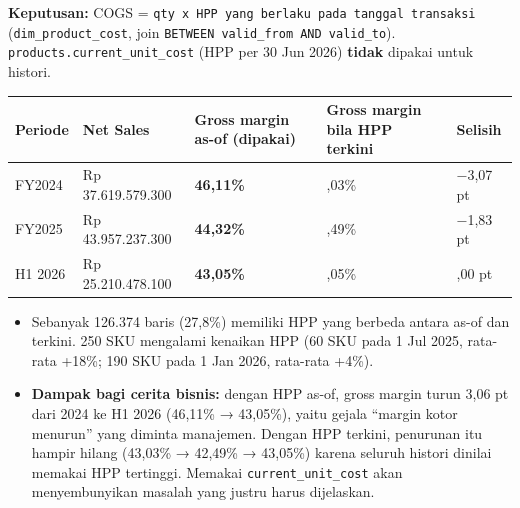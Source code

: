 \documentclass[10pt,a4paper]{article}
\providecommand{\tightlist}{\setlength{\itemsep}{1pt}\setlength{\parskip}{0pt}}
\begin{document}
\textbf{Keputusan:} COGS = \texttt{qty\ x\ HPP\ yang\ berlaku\ pada\ tanggal\ transaksi} (\texttt{dim\_\allowbreak{}product\_\allowbreak{}cost}, join \texttt{BETWEEN\ valid\_\allowbreak{}from\ AND\ valid\_\allowbreak{}to}).
\texttt{products.current\_\allowbreak{}unit\_\allowbreak{}cost} (HPP per 30 Jun 2026) \textbf{tidak} dipakai untuk histori.

{\def\LTcaptype{none} %
\begin{longtable}[]{@{}
  >{\raggedright\arraybackslash}p{}
  >{\raggedleft\arraybackslash}p{}
  >{\raggedleft\arraybackslash}p{}
  >{\raggedleft\arraybackslash}p{}
  >{\raggedleft\arraybackslash}p{}@{}}
\toprule\noalign{}
\begin{minipage}[b]{\linewidth}\raggedright
Periode
\end{minipage} & \begin{minipage}[b]{\linewidth}\raggedleft
Net Sales
\end{minipage} & \begin{minipage}[b]{\linewidth}\raggedleft
Gross margin as-of (dipakai)
\end{minipage} & \begin{minipage}[b]{\linewidth}\raggedleft
Gross margin bila HPP terkini
\end{minipage} & \begin{minipage}[b]{\linewidth}\raggedleft
Selisih
\end{minipage} \\
\midrule\noalign{}
\endhead
\bottomrule\noalign{}
\endlastfoot
FY2024 & Rp 37.619.579.300 & \textbf{46,11\%} & 43,03\% & −3,07 pt \\
FY2025 & Rp 43.957.237.300 & \textbf{44,32\%} & 42,49\% & −1,83 pt \\
H1 2026 & Rp 25.210.478.100 & \textbf{43,05\%} & 43,05\% & 0,00 pt \\
\end{longtable}
}

\begin{itemize}
\tightlist
\item
  Sebanyak 126.374 baris (27,8\%) memiliki HPP yang berbeda antara as-of dan terkini. 250 SKU mengalami kenaikan HPP (60 SKU pada 1 Jul 2025, rata-rata +18\%; 190 SKU pada 1 Jan 2026, rata-rata +4\%).
\item
  \textbf{Dampak bagi cerita bisnis:} dengan HPP as-of, gross margin turun 3,06 pt dari 2024 ke H1 2026 (46,11\% → 43,05\%), yaitu gejala ``margin kotor menurun'' yang diminta manajemen. Dengan HPP terkini, penurunan itu hampir hilang (43,03\% → 42,49\% → 43,05\%) karena seluruh histori dinilai memakai HPP tertinggi. Memakai \texttt{current\_\allowbreak{}unit\_\allowbreak{}cost} akan menyembunyikan masalah yang justru harus dijelaskan.
\end{itemize}
\end{document}
